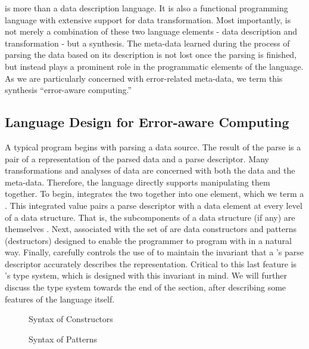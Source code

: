 \documentclass{entcs}
\begin{document}
\datatype{} is more than a data description language. It is also a
functional programming language with extensive support for data
transformation. Most importantly, \datatype{} is not merely a
combination of these two language elements - data description and
transformation - but a synthesis.  The meta-data learned during the
process of parsing the data based on its description is not lost once
the parsing is finished, but instead plays a prominent role in the
programmatic elements of the language. As we are particularly
concerned with error-related meta-data, we term this synthesis
``error-aware computing.''

\subsection{Language Design for Error-aware Computing}

A typical \datatype{} program begins with parsing a data source. The
result of the parse is a pair of a representation of the parsed data
and a parse descriptor. Many transformations and analyses of data are
concerned with both the data and the meta-data. Therefore, the
language directly supports manipulating them together. To begin,
\datatype{} integrates the two together into one element, which we
term a \pvalue{}. This integrated value pairs a parse descriptor with
a data element at every level of a data structure. That is, the
subcomponents of a data structure (if any) are themselves \pvalue{}.
Next, associated with the set of \pvalue{} are data constructors and
patterns (destructors) designed to enable the programmer to program
with \pvalue{} in a natural way.  Finally, \datatype{} carefully
controls the use of \pvalue{} to maintain the invariant that a
\pvalue{}'s parse descriptor accurately describes the representation.
Critical to this last feature is \datatype{}'s type system, which is
designed with this invariant in mind. We will further discuss the type
system towards the end of the section, after describing some features
of the language itself.

\begin{figure}
  \centering
  
  \caption{Syntax of Constructors}
  \label{fig:syntax-terms}
\end{figure}

\begin{figure}
  \centering
  
  \caption{Syntax of Patterns}
  \label{fig:syntax-pat}
\end{figure}
\end{document}
